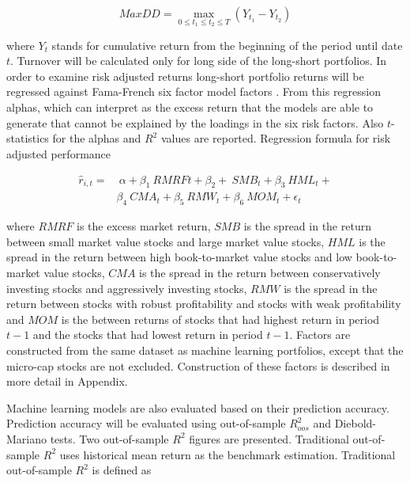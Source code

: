 \documentclass{article}
\begin{document}
\begin{equation}
\label{eq:maxDD}
MaxDD = \max\limits_{0\leq t_1\leq t_2\leq T} (Y_{t_1} - Y_{t_2})
\end{equation}


where $Y_t$ stands for cumulative return from the beginning of the period until date $t$. Turnover will be calculated only for long side of the long-short portfolios. In order to examine risk adjusted returns long-short portfolio returns will be regressed against Fama-French \citeyear{FAMA20151} six factor model factors \footnotemark. From this regression alphas, which can interpret as the excess return that the models are able to generate that cannot be explained by the loadings in the six risk factors. Also $t$-statistics for the alphas and $R^2$ values are reported. Regression formula for risk adjusted performance

\begin{equation}
\label{eq:FFRegFormula}
\begin{split}
\hat r_{i, t} = 	& \ \alpha+ \beta_{1} \ RMRF{t} + \beta_{2} + \ SMB_{t} + \beta_{3} \ HML_{t} + \\
		&  \beta_{4} \ CMA_{t} +  \beta_{5} \ RMW_{t} + \beta_{6} \ MOM_{t} + \epsilon_{t}
\end{split}
\end{equation}

where $RMRF$ is the excess market return, $SMB$ is the spread in the return between small market value stocks and large market value stocks, $HML$ is the spread in the return between high book-to-market value stocks and low book-to-market value stocks, $CMA$ is the spread in the return between conservatively investing stocks and aggressively investing stocks, $RMW$ is the spread in the return between stocks with robust profitability and stocks with weak profitability and $MOM$ is the between returns of stocks that had highest return in period $t-1$ and the stocks that had lowest return in period $t-1$. Factors are constructed from the same dataset as machine learning portfolios, except that the micro-cap stocks are not excluded. Construction of these factors is described in more detail in Appendix.


Machine learning models are also evaluated based on their prediction accuracy. Prediction accuracy will be evaluated using out-of-sample $R^{2}_{oos}$ and Diebold-Mariano tests. Two out-of-sample $R^{2}$ figures are presented. Traditional out-of-sample $R^{2}$ uses historical mean  return as the benchmark estimation. Traditional out-of-sample $R^{2}$ is defined as
\end{document}
